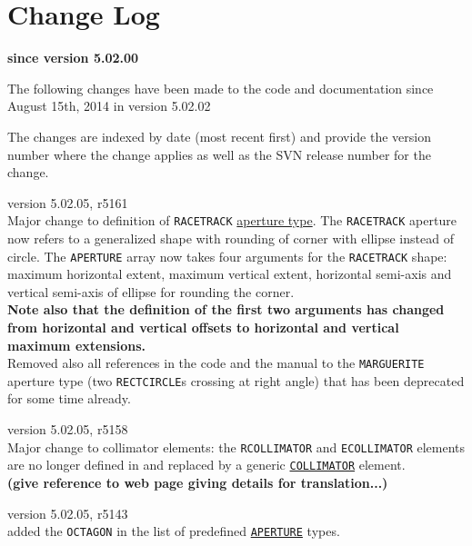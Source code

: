 \chapter{Change Log}
\label{chap:changelog}

\begin{center} 
\textbf{since version 5.02.00}
\end{center}

The following changes have been made to the code and documentation since
August 15th, 2014 in version 5.02.02

The changes are indexed by date (most recent first) and provide the \madx 
version number where the change applies as well as the SVN 
release number for the change. 

\begin{madlist}

   version 5.02.05, r5161\\
  Major change to definition of {\tt RACETRACK} 
  \hyperref[sec:def_aper]{aperture type}. 
  The {\tt RACETRACK} aperture now refers to a generalized shape 
  with rounding of corner with ellipse instead of circle. 
  The {\tt APERTURE} array now takes four arguments for the 
  {\tt RACETRACK} shape: maximum horizontal extent, maximum 
  vertical extent, horizontal semi-axis and vertical semi-axis 
  of ellipse for rounding the corner. \\
  {\bf Note also that the definition of the first two arguments 
  has changed from horizontal and vertical offsets to horizontal 
  and vertical maximum extensions.} \\

  Removed also all references in the code and the manual to the 
  {\tt MARGUERITE} aperture type (two {\tt RECTCIRCLE}s 
  crossing at right angle) that has been deprecated for some 
  time already.

   version 5.02.05, r5158\\
  Major change to collimator elements: the {\tt RCOLLIMATOR} and {\tt ECOLLIMATOR} 
  elements are no longer defined in \madx and replaced by a generic 
  \hyperref[sec:collimator]{\tt COLLIMATOR} element. \\
  {\bf (give reference to web page giving details for translation...)}

   version 5.02.05, r5143\\
  added the {\tt OCTAGON} in the list of predefined 
  \hyperref[chap:aperture]{\tt APERTURE} types.
  

\end{madlist}
